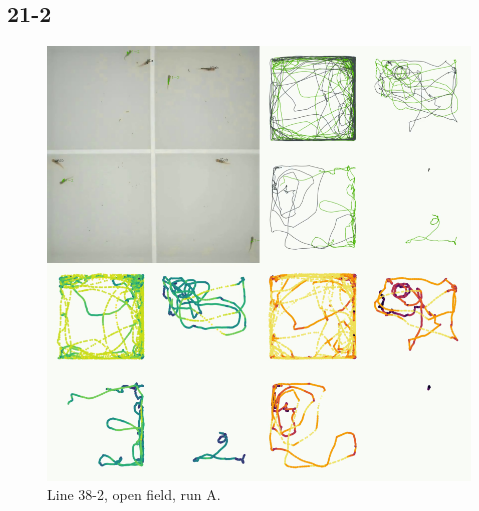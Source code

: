 \documentclass[
]{book}
\begin{document}
\hypertarget{section-4}{%
\subsection{21-2}\label{section-4}}



\begin{figure}
\includegraphics[width=1\linewidth]{figs/mikk_behaviour/four_panel_plots/open_field_20191113_1527_21-2_L_A_300} \caption{Line 38-2, open field, run A.}\label{fig:4p-21-2-of-A}
\end{figure}
\end{document}
